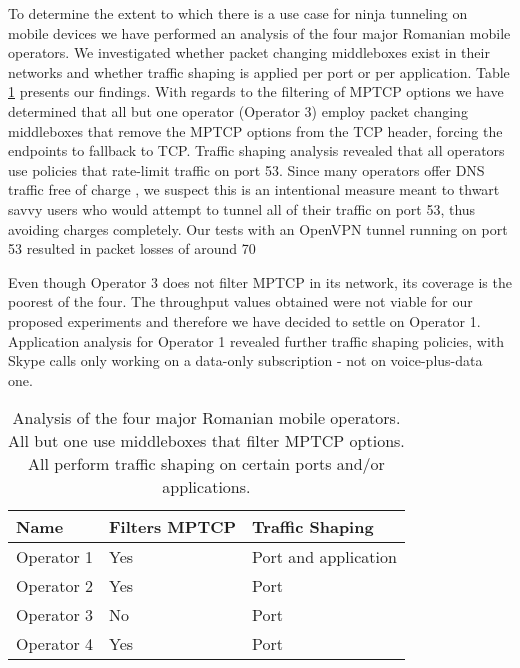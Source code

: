 
To determine the extent to which there is a use case for ninja tunneling on mobile devices we have performed an analysis of the four major Romanian mobile operators. We investigated whether packet changing middleboxes exist in their networks and whether traffic shaping is applied per port or per application. Table \ref{table:operators} presents our findings. With regards to the filtering of MPTCP options we have determined that all but one operator (Operator 3) employ packet changing middleboxes that remove the MPTCP options from the TCP header, forcing the endpoints to fallback to TCP. Traffic shaping analysis revealed that all operators use policies that rate-limit traffic on port 53. Since many operators offer DNS traffic free of charge \cite{freedns}, we suspect this is an intentional measure meant to thwart savvy users who would attempt to tunnel all of their traffic on port 53, thus avoiding charges completely. Our tests with an OpenVPN tunnel running on port 53 resulted in packet losses of around 70%

Even though Operator 3 does not filter MPTCP in its network, its coverage is the poorest of the four. The throughput values obtained were not viable for our proposed experiments and therefore we have decided to settle on Operator 1. Application analysis for Operator 1 revealed further traffic shaping policies, with Skype calls only working on a data-only subscription - not on voice-plus-data one.

\begin{center}
    \begin{table}
    \centering
    \begin{tabular}{ | l | l | l | }
    \hline
    Name & Filters MPTCP & Traffic Shaping \\ \hline
    Operator 1 & Yes & Port and application  \\ \hline
    Operator 2 & Yes & Port \\ \hline
    Operator 3 & No & Port \\ \hline
    Operator 4 & Yes & Port \\ \hline
    \end{tabular}
    \caption{Analysis of the four major Romanian mobile operators. All but one use middleboxes that filter MPTCP options. All perform traffic shaping on certain ports and/or applications. }
    \label{table:operators}
    \end{table}
\end{center}

